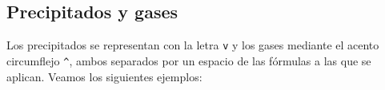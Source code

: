 \vspace{1.5ex}
\begin{SideBySideExample}[xrightmargin=3cm]
\end{SideBySideExample}

\vspace{1.5ex}
\begin{SideBySideExample}[xrightmargin=3cm]
\end{SideBySideExample}

\subsection{Precipitados y gases}
 Los precipitados se representan con la letra \texttt{v} y los gases
mediante el acento circumflejo \texttt{\textasciicircum}, ambos separados por un espacio
de las fórmulas a las que se aplican. Veamos los siguientes ejemplos:

